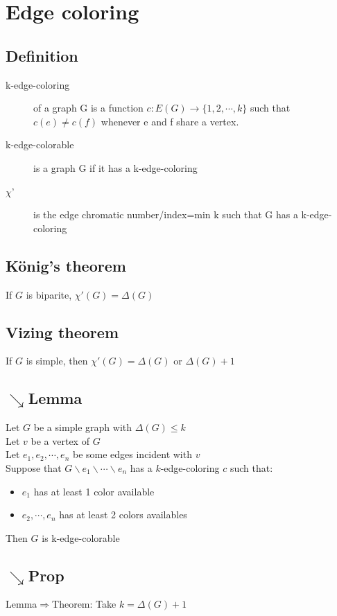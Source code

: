     \section{Edge coloring}
        \subsection{Definition}
            \begin{description}
                \item[k-edge-coloring] of a graph G is a function $c:E(G)\rightarrow \{1, 2, \cdots, k\}$ such that $c(e)\neq c(f)$ whenever e and f share a vertex.
                \item[k-edge-colorable] is a graph G if it has a k-edge-coloring
                \item[$\chi$'] is the edge chromatic number/index=min k such that G has a k-edge-coloring
            \end{description}
        \subsection{König's theorem}
            If $G$ is biparite, $\chi'(G)=\Delta(G)$
        \subsection{Vizing theorem}
            If $G$ is simple, then $\chi'(G)=\Delta(G)\text{ or }\Delta(G)+1$
        \subsection{$\searrow$Lemma}
            Let $G$ be a simple graph with $\Delta(G)\leq k$\\
            Let $v$ be a vertex of $G$\\
            Let $e_1, e_2, \cdots, e_n$ be some edges incident with $v$\\
            Suppose that $G\backslash e_1\backslash \cdots\backslash e_n$ has a $k$-edge-coloring $c$ such that:
            \begin{itemize}
                \item $e_1$ has at least 1 color available
                \item $e_2, \cdots, e_n$ has at least 2 colors availables
            \end{itemize}
            Then $G$ is k-edge-colorable
        \subsection{$\searrow$Prop}
            Lemma$\Rightarrow$Theorem: Take $k=\Delta(G)+1$
